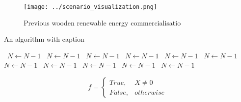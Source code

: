 \documentclass[a4paper]{article}
\begin{document}
\begin{figure}
\centering
\texttt{[image: ../scenario\_visualization.png]}
\caption{Previous wooden renewable energy commercialisatio
}
\end{figure}
 
\begin{algorithm}
\caption{An algorithm with caption}
\begin{algorithmic}
\    \State $N \gets N - 1$
\    \State $N \gets N - 1$
\    \State $N \gets N - 1$
\    \State $N \gets N - 1$
\    \State $N \gets N - 1$
\    \State $N \gets N - 1$
\    \State $N \gets N - 1$
\    \State $N \gets N - 1$
\    \State $N \gets N - 1$
\    \State $N \gets N - 1$
\    \State $N \gets N - 1$
\EndWhile
\end{algorithmic}
\end{algorithm}

\begin{equation}   f =
\begin{cases} True, & X \neq 0\\
False, & otherwise
\end{cases}
\end{equation}
\end{document}
